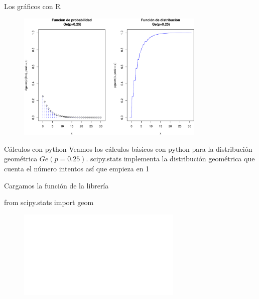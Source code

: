 \documentclass[
  ignorenonframetext,
  aspectratio=169]{beamer}
\newenvironment{Shaded}{\begin{snugshade}}{\end{snugshade}}
\newcommand{\ImportTok}[1]{\textcolor[rgb]{0.00,0.46,0.62}{#1}}
\newcommand{\NormalTok}[1]{\textcolor[rgb]{0.00,0.23,0.31}{#1}}
\begin{document}
\begin{frame}{Los gráficos con R}
\protect\hypertarget{los-gruxe1ficos-con-r}{}
\begin{figure}

{\centering \includegraphics[width=0.8\textwidth,height=\textheight]{Tema_3_1_Notables_files/figure-beamer/graficos22-1.pdf}

}

\end{figure}
\end{frame}

\begin{frame}[fragile]{Cálculos con python}
\protect\hypertarget{cuxe1lculos-con-python}{}
Veamos los cálculos básicos con python para la distribución geométrica
\(Ge(p=0.25)\). scipy.stats implementa la distribución geométrica que
cuenta el número intentos así que empieza en 1

Cargamos la función de la librería

\begin{Shaded}
\begin{Highlighting}[]
\ImportTok{from}\NormalTok{ scipy.stats }\ImportTok{import}\NormalTok{ geom}
\end{Highlighting}
\end{Shaded}

\begin{figure}

{\centering \includegraphics[width=0.7\textwidth,height=\textheight]{Tema_3_1_Notables_files/figure-beamer/geom1-1.pdf}

}

\end{figure}
\end{frame}
\end{document}
